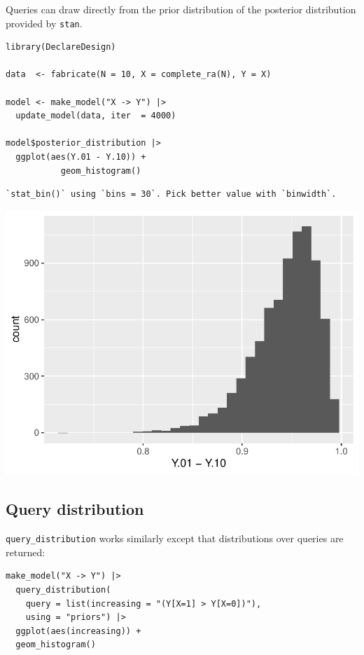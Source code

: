 \documentclass[
  article]{jss}
\begin{document}
Queries can draw directly from the prior distribution of the posterior
distribution provided by \texttt{stan}.

\begin{verbatim}
library(DeclareDesign)

data  <- fabricate(N = 10, X = complete_ra(N), Y = X)

model <- make_model("X -> Y") |>
  update_model(data, iter  = 4000)

model$posterior_distribution |> 
  ggplot(aes(Y.01 - Y.10)) + 
           geom_histogram()
\end{verbatim}

\begin{verbatim}
`stat_bin()` using `bins = 30`. Pick better value with `binwidth`.
\end{verbatim}

\includegraphics{paper_files/figure-pdf/unnamed-chunk-90-1.pdf}

\hypertarget{query-distribution}{%
\subsection{Query distribution}\label{query-distribution}}

\texttt{query\_distribution} works similarly except that distributions
over queries are returned:

\begin{verbatim}
make_model("X -> Y") |> 
  query_distribution(
    query = list(increasing = "(Y[X=1] > Y[X=0])"), 
    using = "priors") |>
  ggplot(aes(increasing)) +
  geom_histogram()
\end{verbatim}
\end{document}
